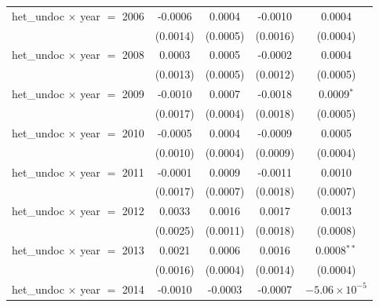 \begin{tabular}{lcccc}
   het\_undoc $\times$ year $=$ 2006               & -0.0006            & 0.0004                    & -0.0010                & 0.0004\\   
                                                   & (0.0014)           & (0.0005)                  & (0.0016)               & (0.0004)\\   
   het\_undoc $\times$ year $=$ 2008               & 0.0003             & 0.0005                    & -0.0002                & 0.0004\\   
                                                   & (0.0013)           & (0.0005)                  & (0.0012)               & (0.0005)\\   
   het\_undoc $\times$ year $=$ 2009               & -0.0010            & 0.0007                    & -0.0018                & 0.0009$^{*}$\\   
                                                   & (0.0017)           & (0.0004)                  & (0.0018)               & (0.0005)\\   
   het\_undoc $\times$ year $=$ 2010               & -0.0005            & 0.0004                    & -0.0009                & 0.0005\\   
                                                   & (0.0010)           & (0.0004)                  & (0.0009)               & (0.0004)\\   
   het\_undoc $\times$ year $=$ 2011               & -0.0001            & 0.0009                    & -0.0011                & 0.0010\\   
                                                   & (0.0017)           & (0.0007)                  & (0.0018)               & (0.0007)\\   
   het\_undoc $\times$ year $=$ 2012               & 0.0033             & 0.0016                    & 0.0017                 & 0.0013\\   
                                                   & (0.0025)           & (0.0011)                  & (0.0018)               & (0.0008)\\   
   het\_undoc $\times$ year $=$ 2013               & 0.0021             & 0.0006                    & 0.0016                 & 0.0008$^{**}$\\   
                                                   & (0.0016)           & (0.0004)                  & (0.0014)               & (0.0004)\\   
   het\_undoc $\times$ year $=$ 2014               & -0.0010            & -0.0003                   & -0.0007                & $-5.06\times 10^{-5}$\\    

\end{tabular}
